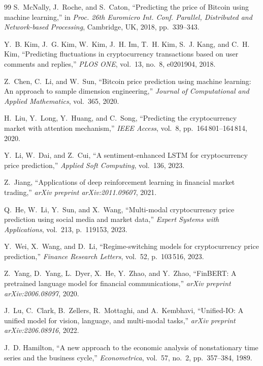 \documentclass[journal]{IEEEtran}
\begin{document}
\begin{thebibliography}{99}
S.~McNally, J.~Roche, and S.~Caton,
``Predicting the price of Bitcoin using machine learning,''
in \textit{Proc. 26th Euromicro Int. Conf. Parallel, Distributed and
Network-based Processing}, Cambridge, UK, 2018, pp.~339--343.

Y.~B. Kim, J.~G. Kim, W.~Kim, J.~H. Im, T.~H. Kim, S.~J. Kang, and C.~H. Kim,
``Predicting fluctuations in cryptocurrency transactions based on user
comments and replies,''
\textit{PLOS ONE}, vol.~13, no.~8, e0201904, 2018.

Z.~Chen, C.~Li, and W.~Sun,
``Bitcoin price prediction using machine learning: An approach to sample
dimension engineering,''
\textit{Journal of Computational and Applied Mathematics}, vol.~365, 2020.

H.~Liu, Y.~Long, Y.~Huang, and C.~Song,
``Predicting the cryptocurrency market with attention mechanism,''
\textit{IEEE Access}, vol.~8, pp.~164\,801--164\,814, 2020.

Y.~Li, W.~Dai, and Z.~Cui,
``A sentiment-enhanced LSTM for cryptocurrency price prediction,''
\textit{Applied Soft Computing}, vol.~136, 2023.

Z.~Jiang,
``Applications of deep reinforcement learning in financial market trading,''
\textit{arXiv preprint arXiv:2011.09607}, 2021.

Q.~He, W.~Li, Y.~Sun, and X.~Wang,
``Multi-modal cryptocurrency price prediction using social media and market data,''
\textit{Expert Systems with Applications}, vol.~213, p.~119153, 2023.

Y.~Wei, X.~Wang, and D.~Li,
``Regime-switching models for cryptocurrency price prediction,''
\textit{Finance Research Letters}, vol.~52, p.~103\,516, 2023.

Z.~Yang, D.~Yang, L.~Dyer, X.~He, Y.~Zhao, and Y.~Zhao,
``FinBERT: A pretrained language model for financial communications,''
\textit{arXiv preprint arXiv:2006.08097}, 2020.

J.~Lu, C.~Clark, B.~Zellers, R.~Mottaghi, and A.~Kembhavi,
``Unified-IO: A unified model for vision, language, and multi-modal tasks,''
\textit{arXiv preprint arXiv:2206.08916}, 2022.

J.~D. Hamilton,
``A new approach to the economic analysis of nonstationary time series
and the business cycle,''
\textit{Econometrica}, vol.~57, no.~2, pp.~357--384, 1989.


\end{thebibliography}
\end{document}
